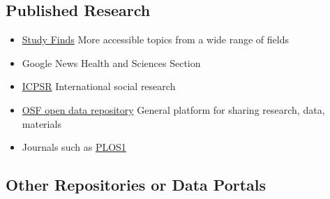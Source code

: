 \documentclass[
  letterpaper,
  DIV=11,
  numbers=noendperiod]{scrartcl}
\providecommand{\tightlist}{%
  \setlength{\itemsep}{0pt}\setlength{\parskip}{0pt}}\usepackage{longtable,booktabs,array}
\begin{document}
\subsection{Published Research}\label{published-research}

\begin{itemize}
\tightlist
\item
  \href{https://studyfinds.org/}{Study Finds} More accessible topics
  from a wide range of fields
\item
  Google News Health and Sciences Section
\item
  \href{https://www.icpsr.umich.edu/web/pages/ICPSR/index.html}{ICPSR}
  International social research
\item
  \href{https://osf.io/}{OSF open data repository} General platform for
  sharing research, data, materials
\item
  Journals such as \href{https://journals.plos.org/plosone/}{PLOS1}
\end{itemize}

\subsection{Other Repositories or Data
Portals}\label{other-repositories-or-data-portals}
\end{document}
